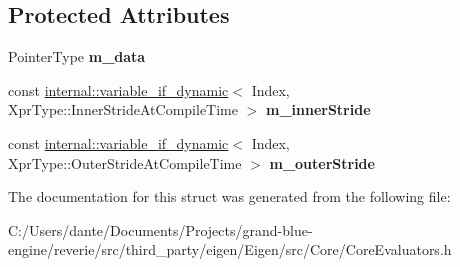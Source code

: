 \subsection*{Protected Attributes}
\begin{DoxyCompactItemize}
\item 
\mbox{\label{struct_eigen_1_1internal_1_1mapbase__evaluator_a1fd0a4a8d3565c6f4bd9783e10c01fd1}} 
Pointer\+Type {\bfseries m\+\_\+data}
\item 
\mbox{\label{struct_eigen_1_1internal_1_1mapbase__evaluator_a7256fafe663393f7f64f83f71fa05501}} 
const \mbox{\hyperlink{class_eigen_1_1internal_1_1variable__if__dynamic}{internal\+::variable\+\_\+if\+\_\+dynamic}}$<$ Index, Xpr\+Type\+::\+Inner\+Stride\+At\+Compile\+Time $>$ {\bfseries m\+\_\+inner\+Stride}
\item 
\mbox{\label{struct_eigen_1_1internal_1_1mapbase__evaluator_addf5c5a411f67341faaba7cb196630fb}} 
const \mbox{\hyperlink{class_eigen_1_1internal_1_1variable__if__dynamic}{internal\+::variable\+\_\+if\+\_\+dynamic}}$<$ Index, Xpr\+Type\+::\+Outer\+Stride\+At\+Compile\+Time $>$ {\bfseries m\+\_\+outer\+Stride}
\end{DoxyCompactItemize}


The documentation for this struct was generated from the following file\+:\begin{DoxyCompactItemize}
\item 
C\+:/\+Users/dante/\+Documents/\+Projects/grand-\/blue-\/engine/reverie/src/third\+\_\+party/eigen/\+Eigen/src/\+Core/Core\+Evaluators.\+h\end{DoxyCompactItemize}
